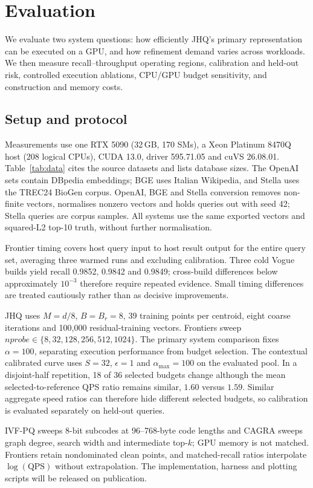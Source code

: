 \section{Evaluation}
\label{sec:experi}
We evaluate two system questions: how efficiently JHQ's primary representation
can be executed on a GPU, and how refinement demand varies across workloads.
We then measure recall--throughput operating regions, calibration and held-out
risk, controlled execution ablations, CPU/GPU budget sensitivity, and
construction and memory costs.

\subsection{Setup and protocol}
\label{sec:setup}
Measurements use one RTX 5090 (32\,GB, 170 SMs), a Xeon Platinum 8470Q host
(208 logical CPUs), CUDA 13.0, driver 595.71.05 and cuVS 26.08.01.
Table~\ref{tab:data} cites the source datasets and lists database sizes. The
OpenAI sets contain DBpedia embeddings; BGE uses Italian Wikipedia, and Stella
uses the TREC24 BioGen corpus. OpenAI, BGE and Stella conversion removes
non-finite vectors, normalises nonzero vectors and holds queries out with seed
42; Stella queries are corpus samples. All systems use the same exported
vectors and squared-L2 top-10 truth, without further normalisation.

Frontier timing covers host query input to host result output for the entire
query set, averaging three warmed runs and excluding calibration. Three cold
Vogue builds yield recall 0.9852, 0.9842 and 0.9849; cross-build differences
below approximately $10^{-3}$ therefore require repeated evidence. Small
timing differences are treated cautiously rather than as decisive
improvements.

JHQ uses $M=d/8$, $B=B_r=8$, 39 training points per centroid, eight coarse
iterations and 100,000 residual-training vectors. Frontiers sweep
$\mathit{nprobe}\in\{8,32,128,256,512,1024\}$. The primary system comparison
fixes $\alpha=100$, separating execution performance from budget selection.
The contextual calibrated curve uses $S=32$, $\epsilon=1$ and
$\alpha_{\max}=100$ on the evaluated pool. In a disjoint-half repetition, 18
of 36 selected budgets change although the mean selected-to-reference QPS
ratio remains similar, $1.60$ versus $1.59$. Similar aggregate speed ratios
can therefore hide different selected budgets, so calibration is evaluated
separately on held-out queries.

IVF-PQ sweeps 8-bit subcodes at 96--768-byte code lengths and CAGRA sweeps
graph degree, search width and intermediate top-$k$; GPU memory is not
matched. Frontiers retain nondominated clean points, and matched-recall ratios
interpolate $\log(\mathrm{QPS})$ without extrapolation. The implementation,
harness and plotting scripts will be released on publication.

